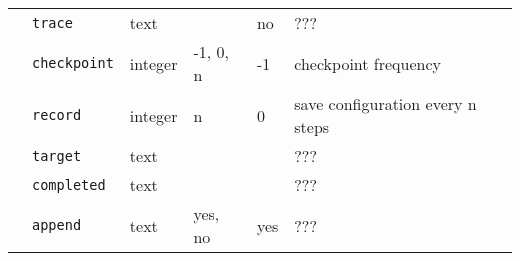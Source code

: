 \begin{table}[h]
\begin{center}
\begin{tabularx}{\textwidth}{l l l l l l }
   &   \texttt{trace}         &  text              &                  & no                & ???                      \\
   &   \texttt{checkpoint}   &  integer           &   -1, 0, n       & -1                & checkpoint frequency \\
   &   \texttt{record}      &  integer           &   n              & 0                & save configuration every n steps  \\
   &   \texttt{target}        &  text              &                  &                   & ???  \\
   &   \texttt{completed}     &  text              &                  &                   & ???  \\
   &   \texttt{append}        &  text              &   yes, no        & yes               & ???  \\
\hline

\end{tabularx}
\end{center}
\end{table}

